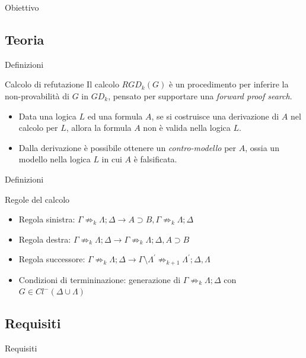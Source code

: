 \documentclass{beamer}
\begin{document}
\begin{darkframes}
\begin{frame}{Obiettivo}
    \end{frame}

    \subsection{Teoria}

    \begin{frame}{Definizioni}
        \begin{block}{Calcolo di refutazione}
            Il calcolo $RGD_k(G)$ è un procedimento per inferire la non-provabilità di $G$ in $GD_k$, pensato per supportare una \textit{forward proof search}.
        \end{block}
        \begin{itemize}
            \item Data una logica $L$ ed una formula $A$, se si costruisce una derivazione di $A$ nel calcolo per $L$, allora la formula $A$ non è valida nella logica $L$.
            \item Dalla derivazione è possibile ottenere un \textit{contro-modello} per $A$, ossia un modello nella logica $L$ in cui $A$ è falsificata.
        \end{itemize}
    \end{frame}

    \begin{frame}{Definizioni}
        \begin{block}{Regole del calcolo}
            \begin{itemize}
                \item Regola sinistra: $\Gamma \not\Rightarrow_k \Lambda; \Delta \rightarrow A \supset B, \Gamma \not\Rightarrow_k \Lambda; \Delta$
                \item Regola destra: $\Gamma \not\Rightarrow_k \Lambda; \Delta \rightarrow \Gamma \not\Rightarrow_k \Lambda; \Delta, A \supset B$
                \item Regola successore: $\Gamma \not\Rightarrow_k \Lambda; \Delta \rightarrow \Gamma \setminus \Lambda^{'} \not\Rightarrow_{k+1} \Lambda^{'}; \Delta, \Lambda$
                \item Condizioni di termininazione: generazione di $\Gamma \not\Rightarrow_k \Lambda; \Delta$ con $G \in Cl^-(\Delta \cup \Lambda)$
            \end{itemize}
        \end{block}
    \end{frame}

    \subsection{Requisiti}
    \begin{frame}{Requisiti}


\end{frame}
\end{darkframes}
\end{document}
